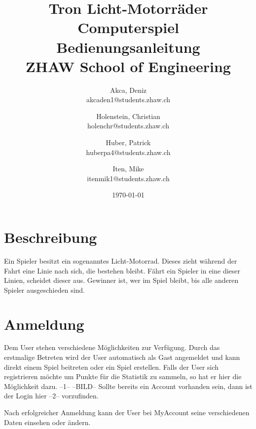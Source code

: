 \documentclass[11pt,ngerman]{article}
\begin{document}
    \title{Tron Licht-Motorräder Computerspiel\\
        \vspace{1cm}
        Bedienungsanleitung \\
        \vspace{0.5cm}
        \small{}ZHAW  School of Engineering
        \vspace{1.5cm}
    }
    \author{
        Akca, Deniz\\
        \small{akcaden1@students.zhaw.ch}
        \and
        Holenstein, Christian\\
        \small{holenchr@students.zhaw.ch}
        \and
        Huber, Patrick\\
        \small{huberpa4@students.zhaw.ch}
        \and
        Iten, Mike\\
        \small{itenmik1@students.zhaw.ch}
        \vspace{1.5cm}
    }
   \date{\today}

    \maketitle
    \newpage

    \tableofcontents
	\listoffigures
    \newpage
    
    \section{Beschreibung}
    
    Ein Spieler besitzt ein sogenanntes Licht-Motorrad. Dieses zieht während der Fahrt eine Linie nach sich, die bestehen bleibt. Fährt ein Spieler in eine dieser Linien, scheidet dieser aus. Gewinner ist, wer im Spiel bleibt, bis alle anderen Spieler ausgeschieden sind.
    
    \section{Anmeldung}
    
    Dem User stehen verschiedene Möglichkeiten zur Verfügung. Durch das erstmalige Betreten wird der User automatisch als Gast angemeldet und kann direkt einem Spiel beitreten oder ein Spiel erstellen. 
    Falls der User sich registrieren möchte um Punkte für die Statistik zu sammeln, so hat er hier die Möglichkeit dazu. --1--
    --BILD--
    Sollte bereits ein Account vorhanden sein, dann ist der Login hier --2-- vorzufinden.
    
    
    Nach erfolgreicher Anmeldung kann der User bei MyAccount seine verschiedenen Daten einsehen oder ändern. 
    
\end{document}
